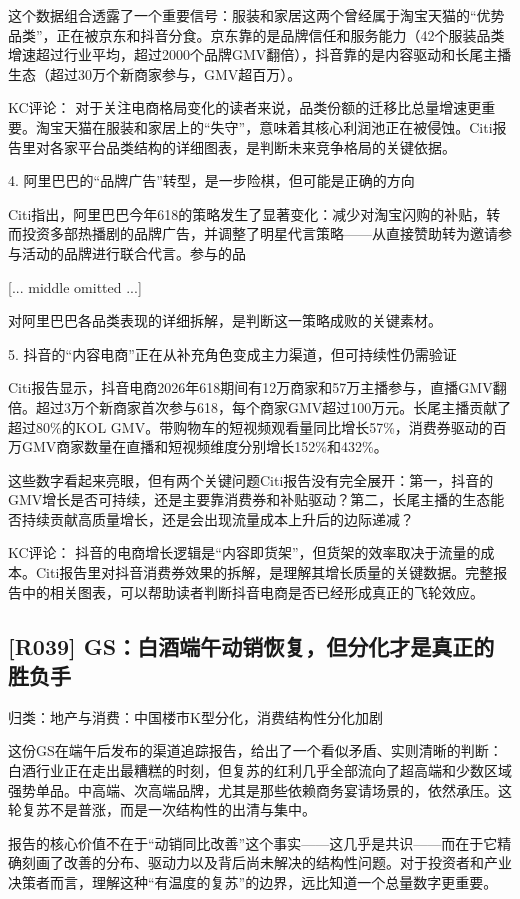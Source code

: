 \documentclass[11pt]{ctexart}
\begin{document}
这个数据组合透露了一个重要信号：服装和家居这两个曾经属于淘宝天猫的“优势品类”，正在被京东和抖音分食。京东靠的是品牌信任和服务能力（42个服装品类增速超过行业平均，超过2000个品牌GMV翻倍），抖音靠的是内容驱动和长尾主播生态（超过30万个新商家参与，GMV超百万）。

KC评论： 对于关注电商格局变化的读者来说，品类份额的迁移比总量增速更重要。淘宝天猫在服装和家居上的“失守”，意味着其核心利润池正在被侵蚀。Citi报告里对各家平台品类结构的详细图表，是判断未来竞争格局的关键依据。

4. 阿里巴巴的“品牌广告”转型，是一步险棋，但可能是正确的方向

Citi指出，阿里巴巴今年618的策略发生了显著变化：减少对淘宝闪购的补贴，转而投资多部热播剧的品牌广告，并调整了明星代言策略——从直接赞助转为邀请参与活动的品牌进行联合代言。参与的品

[... middle omitted ...]

对阿里巴巴各品类表现的详细拆解，是判断这一策略成败的关键素材。

5. 抖音的“内容电商”正在从补充角色变成主力渠道，但可持续性仍需验证

Citi报告显示，抖音电商2026年618期间有12万商家和57万主播参与，直播GMV翻倍。超过3万个新商家首次参与618，每个商家GMV超过100万元。长尾主播贡献了超过80\%的KOL GMV。带购物车的短视频观看量同比增长57\%，消费券驱动的百万GMV商家数量在直播和短视频维度分别增长152\%和432\%。

这些数字看起来亮眼，但有两个关键问题Citi报告没有完全展开：第一，抖音的GMV增长是否可持续，还是主要靠消费券和补贴驱动？第二，长尾主播的生态能否持续贡献高质量增长，还是会出现流量成本上升后的边际递减？

KC评论： 抖音的电商增长逻辑是“内容即货架”，但货架的效率取决于流量的成本。Citi报告里对抖音消费券效果的拆解，是理解其增长质量的关键数据。完整报告中的相关图表，可以帮助读者判断抖音电商是否已经形成真正的飞轮效应。

\subsection{[R039] GS：白酒端午动销恢复，但分化才是真正的胜负手}
{\small\color{refgray}归类：地产与消费：中国楼市K型分化，消费结构性分化加剧}

这份GS在端午后发布的渠道追踪报告，给出了一个看似矛盾、实则清晰的判断：白酒行业正在走出最糟糕的时刻，但复苏的红利几乎全部流向了超高端和少数区域强势单品。中高端、次高端品牌，尤其是那些依赖商务宴请场景的，依然承压。这轮复苏不是普涨，而是一次结构性的出清与集中。

报告的核心价值不在于“动销同比改善”这个事实——这几乎是共识——而在于它精确刻画了改善的分布、驱动力以及背后尚未解决的结构性问题。对于投资者和产业决策者而言，理解这种“有温度的复苏”的边界，远比知道一个总量数字更重要。
\end{document}

